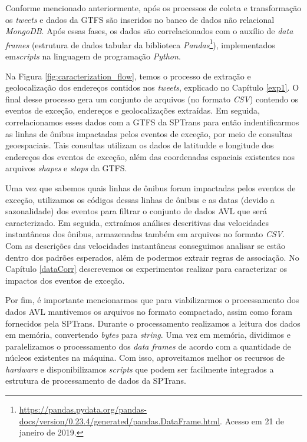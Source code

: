 \documentclass[
	12pt,				%
	oneside,			%
	a4paper,			%
	english,			%
	brazil				%
	]{abntex2ppgsi}
\begin{document}
{{{Conforme mencionado anteriormente, após os processos de coleta e transformação os \textit{tweets} e dados da GTFS são inseridos no banco de dados não relacional \textit{MongoDB}. Após essas fases, os dados são correlacionados com o auxílio de \textit{data frames} (estrutura de dados tabular da biblioteca \textit{Pandas}\footnote{\url{https://pandas.pydata.org/pandas-docs/version/0.23.4/generated/pandas.DataFrame.html}. Acesso em 21 de janeiro de 2019.}), implementados em\textit{scripts} na linguagem de programação \textit{Python}.

Na Figura \ref{fig:caracterization_flow}, temos o processo de extração e geolocalização dos endereços contidos nos \textit{tweets}, explicado no Capítulo \ref{exp1}. O final desse processo gera um conjunto de arquivos (no formato \textit{CSV}) contendo os eventos de exceção, endereços e geolocalizações extraídas.  Em seguida, correlacionamos esses dados com a GTFS da SPTrans para então indentificarmos as linhas de ônibus impactadas pelos eventos de exceção, por meio de consultas geoespaciais. Tais consultas utilizam os dados de latitudde e longitude dos endereços dos eventos de exceção, além das coordenadas espaciais existentes nos arquivos \textit{shapes} e \textit{stops} da GTFS.

Uma vez que sabemos quais linhas de ônibus foram impactadas pelos eventos de exceção, utilizamos os códigos dessas linhas de ônibus e as datas (devido a sazonalidade) dos eventos para filtrar o conjunto de dados AVL que será caracterizado. Em seguida, extraímos análises descritivas das velocidades instantâneas dos ônibus, armazenadas também em arquivos no formato \textit{CSV}. Com as descrições das velocidades instantâneas conseguimos analisar se estão dentro dos padrões esperados, além de podermos extrair regras de associação. No Capítulo \ref{dataCorr} descrevemos os experimentos realizar para caracterizar os impactos dos eventos de exceção.

Por fim, é importante mencionarmos que para viabilizarmos o processamento dos dados AVL mantivemos os arquivos no formato compactado, assim como foram fornecidos pela SPTrans. Durante o processamento realizamos a leitura dos dados em memória, convertendo \textit{bytes} para \textit{string}. Uma vez em memória, dividimos e paralelizamos o processamento dos \textit{data frames} de acordo com a quantidade de núcleos existentes na máquina. Com isso, aproveitamos melhor os recursos de \textit{hardware} e disponibilizamos \textit{scripts} que podem ser facilmente integrados a estrutura de processamento de dados da SPTrans.

}}}
\end{document}
